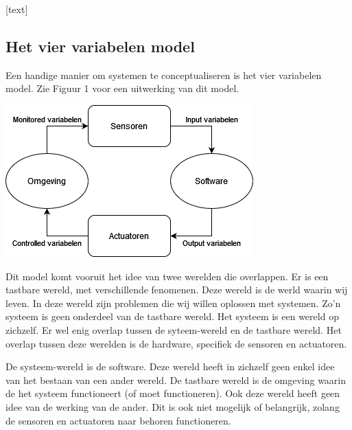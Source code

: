 \documentclass{article}
\begin{document}
		[text]
		
		\subsection{Het vier variabelen model}
		
		Een handige manier om systemen te conceptualiseren is het vier variabelen model. Zie Figuur 1 voor een uitwerking van dit model.
		
		\begin{center}
			\begin{minipage}{0.48\linewidth}
				\includegraphics[width=\linewidth]{4variabelen.png}
			\end{minipage}
			\hfill
		\end{center}

		Dit model komt vooruit het idee van twee werelden die overlappen. Er is een tastbare wereld, met verschillende fenomenen. Deze wereld is de werld waarin wij leven. In deze wereld zijn problemen die wij willen oplossen met systemen. Zo'n systeem is geen onderdeel van de tastbare wereld. Het systeem is een wereld op zichzelf. Er wel enig overlap tussen de syteem-wereld en de tastbare wereld. Het overlap tussen deze werelden is de hardware, specifiek de sensoren en actuatoren.

		De systeem-wereld is de software. Deze wereld heeft in zichzelf geen enkel idee van het bestaan van een ander wereld. De tastbare wereld is de omgeving waarin de het systeem functioneert (of moet functioneren). Ook deze wereld heeft geen idee van de werking van de ander. Dit is ook niet mogelijk of belangrijk, zolang de sensoren en actuatoren naar behoren functioneren.
\end{document}
